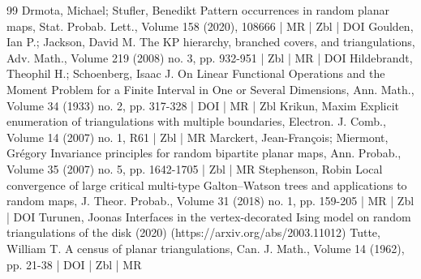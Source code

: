 \documentclass[10pt]{amsart}
\theoremstyle{definition}\newtheorem{defi}[theo]{Definition}\newtheorem{rema}[theo]{Remark}\newtheorem{exam}[theo]{Example}\newtheorem{exem}[theo]{Example}\newtheorem{nota}[theo]{Notation}
\begin{document}
\begin{thebibliography}{99}
Drmota, Michael; Stufler, Benedikt Pattern occurrences in random planar maps, Stat. Probab. Lett., Volume 158 (2020), 108666 | MR | Zbl | DOI
Goulden, Ian P.; Jackson, David M. The KP hierarchy, branched covers, and triangulations, Adv. Math., Volume 219 (2008) no. 3, pp. 932-951 | Zbl | MR | DOI
Hildebrandt, Theophil H.; Schoenberg, Isaac J. On Linear Functional Operations and the Moment Problem for a Finite Interval in One or Several Dimensions, Ann. Math., Volume 34 (1933) no. 2, pp. 317-328 | DOI | MR | Zbl
Krikun, Maxim Explicit enumeration of triangulations with multiple boundaries, Electron. J. Comb., Volume 14 (2007) no. 1, R61 | Zbl | MR
Marckert, Jean-François; Miermont, Grégory Invariance principles for random bipartite planar maps, Ann. Probab., Volume 35 (2007) no. 5, pp. 1642-1705 | Zbl | MR
Stephenson, Robin Local convergence of large critical multi-type Galton–Watson trees and applications to random maps, J. Theor. Probab., Volume 31 (2018) no. 1, pp. 159-205 | MR | Zbl | DOI
Turunen, Joonas Interfaces in the vertex-decorated Ising model on random triangulations of the disk (2020) (https://arxiv.org/abs/2003.11012)
Tutte, William T. A census of planar triangulations, Can. J. Math., Volume 14 (1962), pp. 21-38 | DOI | Zbl | MR
\end{thebibliography}
\end{document}
